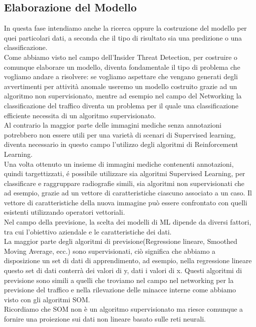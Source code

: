 \documentclass[../tesi.tex]{subfiles}
\begin{document}
\subsection{Elaborazione del Modello}
In questa fase intendiamo anche la ricerca oppure la costruzione del modello per quei particolari dati, a seconda che il tipo di risultato sia una predizione o una classificazione.\\
Come abbiamo visto nel campo dell’Insider Threat Detection, per costruire o comunque elaborare un modello, diventa fondamentale il tipo di problema che vogliamo andare a risolvere:
se vogliamo aspettare che vengano generati degli avvertimenti per attività anomale useremo un modello costruito grazie ad un algoritmo non supervisionato, mentre ad esempio nel campo del Networking la classificazione del traffico diventa un problema per il quale una classificazione efficiente necessita di un algoritmo supervisionato.\\
Al contrario la maggior parte delle immagini mediche senza annotazioni potrebbero non essere utili per una varietà di scenari di Supervised learning, diventa necessario in questo campo l'utilizzo degli algoritmi di Reinforcement Learning.\\
Una volta ottenuto un insieme di immagini mediche contenenti annotazioni, quindi targettizzati, é possibile utilizzare sia algoritmi Supervised Learning, per classificare e raggruppare radiografie simili, sia algoritmi non supervisionati che ad esempio, grazie ad un vettore di caratteristiche ciascuno associato a un caso. Il vettore di caratteristiche della nuova immagine può essere confrontato con quelli esistenti utilizzando operatori vettoriali.\\
Nel campo della previsione, la scelta dei modelli di ML dipende da diversi fattori, tra cui l’obiettivo aziendale e le caratteristiche dei dati.\\
La maggior parte degli algoritmi di previsione(Regressione lineare, Smoothed Moving Average, ecc.) sono supervisionati, ciò significa che abbiamo a disposizione un set di dati di apprendimento, ad esempio, nella regressione lineare questo set di dati conterrà dei valori di y, dati i valori di x. Questi algoritmi di previsione sono simili a quelli che troviamo nel campo nel networking per la previsione del traffico e nella rilevazione delle minacce interne come abbiamo visto con gli algoritmi SOM.\\
Ricordiamo che SOM non è un algoritmo supervisionato ma riesce comunque a fornire una proiezione sui dati non lineare basato sulle reti neurali.
\newpage
\end{document}
